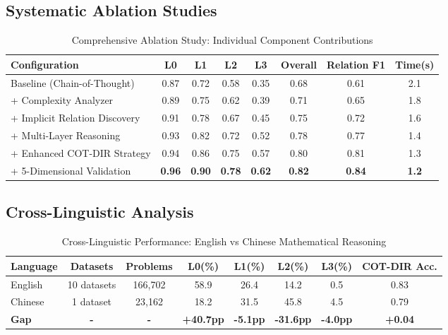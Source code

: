 \subsection{Systematic Ablation Studies}

\begin{table}[htbp]
\caption{Comprehensive Ablation Study: Individual Component Contributions}
\label{tab:detailed_ablation}
\centering
\small
\begin{tabular}{lccccccc}
\toprule
\textbf{Configuration} & \textbf{L0} & \textbf{L1} & \textbf{L2} & \textbf{L3} & \textbf{Overall} & \textbf{Relation F1} & \textbf{Time(s)} \\
\midrule
Baseline (Chain-of-Thought) & 0.87 & 0.72 & 0.58 & 0.35 & 0.68 & 0.61 & 2.1 \\
+ Complexity Analyzer & 0.89 & 0.75 & 0.62 & 0.39 & 0.71 & 0.65 & 1.8 \\
+ Implicit Relation Discovery & 0.91 & 0.78 & 0.67 & 0.45 & 0.75 & 0.72 & 1.6 \\
+ Multi-Layer Reasoning & 0.93 & 0.82 & 0.72 & 0.52 & 0.78 & 0.77 & 1.4 \\
+ Enhanced COT-DIR Strategy & 0.94 & 0.86 & 0.75 & 0.57 & 0.80 & 0.81 & 1.3 \\
+ 5-Dimensional Validation & \textbf{0.96} & \textbf{0.90} & \textbf{0.78} & \textbf{0.62} & \textbf{0.82} & \textbf{0.84} & \textbf{1.2} \\
\bottomrule
\end{tabular}
\end{table}

\subsection{Cross-Linguistic Analysis}

\begin{table}[htbp]
\caption{Cross-Linguistic Performance: English vs Chinese Mathematical Reasoning}
\label{tab:cross_linguistic}
\centering
\small
\begin{tabular}{lccccccc}
\toprule
\textbf{Language} & \textbf{Datasets} & \textbf{Problems} & \textbf{L0(\%)} & \textbf{L1(\%)} & \textbf{L2(\%)} & \textbf{L3(\%)} & \textbf{COT-DIR Acc.} \\
\midrule
English & 10 datasets & 166,702 & 58.9 & 26.4 & 14.2 & 0.5 & 0.83 \\
Chinese & 1 dataset & 23,162 & 18.2 & 31.5 & 45.8 & 4.5 & 0.79 \\
\midrule
\textbf{Gap} & \textbf{-} & \textbf{-} & \textbf{+40.7pp} & \textbf{-5.1pp} & \textbf{-31.6pp} & \textbf{-4.0pp} & \textbf{+0.04} \\
\bottomrule
\end{tabular}
\end{table}

